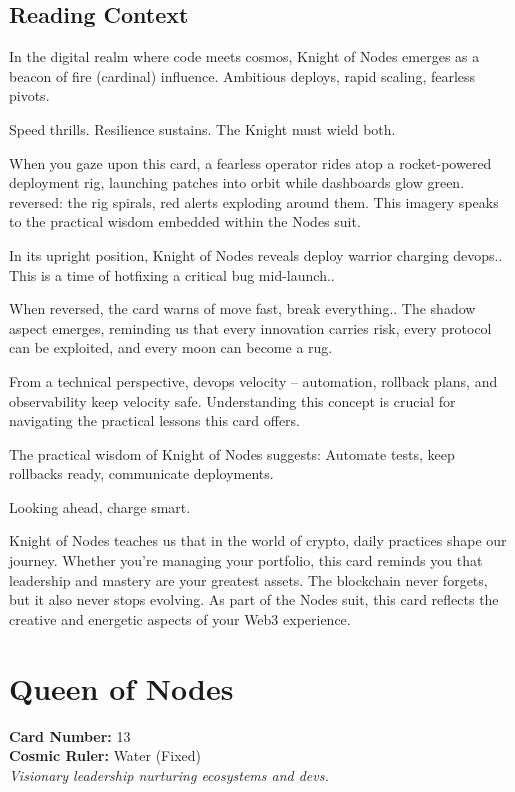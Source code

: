 \documentclass[11pt,oneside]{book}
\begin{document}
\begin{minipage}[t]{0.55\textwidth}
  \subsection*{Reading Context}
  In the digital realm where code meets cosmos, Knight of Nodes emerges as a beacon of fire (cardinal) influence. Ambitious deploys, rapid scaling, fearless pivots.

  Speed thrills. Resilience sustains. The Knight must wield both.

  When you gaze upon this card, a fearless operator rides atop a rocket-powered deployment rig, launching patches into orbit while dashboards glow green. reversed: the rig spirals, red alerts exploding around them. This imagery speaks to the practical wisdom embedded within the Nodes suit.

  In its upright position, Knight of Nodes reveals deploy warrior charging devops.. This is a time of hotfixing a critical bug mid-launch..

  When reversed, the card warns of move fast, break everything.. The shadow aspect emerges, reminding us that every innovation carries risk, every protocol can be exploited, and every moon can become a rug.

  From a technical perspective, devops velocity – automation, rollback plans, and observability keep velocity safe. Understanding this concept is crucial for navigating the practical lessons this card offers.

  The practical wisdom of Knight of Nodes suggests: Automate tests, keep rollbacks ready, communicate deployments.

  Looking ahead, charge smart.

  Knight of Nodes teaches us that in the world of crypto, daily practices shape our journey. Whether you're managing your portfolio, this card reminds you that leadership and mastery are your greatest assets. The blockchain never forgets, but it also never stops evolving. As part of the Nodes suit, this card reflects the creative and energetic aspects of your Web3 experience.

\end{minipage}

\newpage
\section*{Queen of Nodes}

\begin{minipage}[t]{0.55\textwidth}
  \vspace{0pt}
  \textbf{Card Number:} 13\\  \textbf{Cosmic Ruler:} Water (Fixed)\\  \textit{Visionary leadership nurturing ecosystems and devs.}
\end{minipage}
\end{document}
